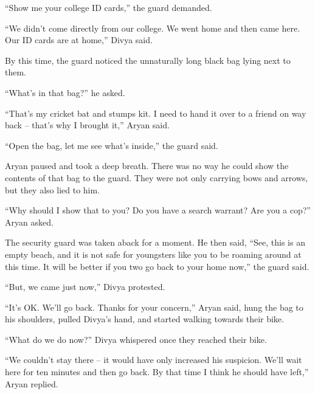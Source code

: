 “Show me your college ID cards,” the guard demanded.

“We didn't come directly from our college. We went home and then came here. Our
ID cards are at home,” Divya said.

By this time, the guard noticed the unnaturally long black bag lying next to
them.

“What's in that bag?” he asked.

“That's my cricket bat and stumps kit. I need to hand it over to a friend on way
back – that's why I brought it,” Aryan said.

“Open the bag, let me see what's inside,” the guard said.

Aryan paused and took a deep breath. There was no way he could show the contents
of that bag to the guard. They were not only carrying bows and arrows, but they
also lied to him.

“Why should I show that to you? Do you have a search warrant? Are you a cop?”
Aryan asked.

The security guard was taken aback for a moment. He then said, “See, this is an
empty beach, and it is not safe for youngsters like you to be roaming around at
this time. It will be better if you two go back to your home now,” the guard
said.

“But, we came just now,” Divya protested.

“It's OK. We'll go back. Thanks for your concern,” Aryan said, hung the bag to
his shoulders, pulled Divya's hand, and started walking towards their bike.

“What do we do now?” Divya whispered once they reached their bike.

“We couldn't stay there – it would have only increased his suspicion. We'll wait
here for ten minutes and then go back. By that time I think he should have
left,” Aryan replied.
